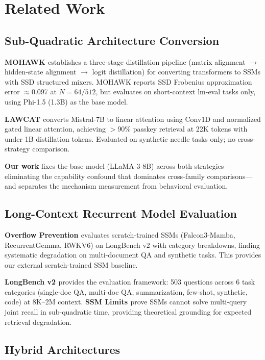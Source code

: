\section{Related Work}

\subsection{Sub-Quadratic Architecture Conversion}

\textbf{MOHAWK \citep{Bick2024MOHAWK}} establishes a three-stage distillation pipeline
(matrix alignment $\to$ hidden-state alignment $\to$ logit distillation) for converting
transformers to SSMs with SSD structured mixers. MOHAWK reports SSD Frobenius approximation
error $\approx$0.097 at $N=64/512$, but evaluates on short-context lm-eval tasks only, using
Phi-1.5 (1.3B) as the base model.

\textbf{LAWCAT \citep{Liu2025LAWCAT}} converts Mistral-7B to linear attention using Conv1D and
normalized gated linear attention, achieving $>$90\% passkey retrieval at 22K tokens with under
1B distillation tokens. Evaluated on synthetic needle tasks only; no cross-strategy comparison.

\textbf{Our work} fixes the base model (LLaMA-3-8B) across both strategies---eliminating the
capability confound that dominates cross-family comparisons---and separates the mechanism
measurement from behavioral evaluation.

\subsection{Long-Context Recurrent Model Evaluation}

\textbf{Overflow Prevention \citep{BenKish2025OverflowPrevention}} evaluates scratch-trained
SSMs (Falcon3-Mamba, RecurrentGemma, RWKV6) on LongBench v2 with category breakdowns, finding
systematic degradation on multi-document QA and synthetic tasks. This provides our external
scratch-trained SSM baseline.

\textbf{LongBench v2 \citep{Bai2024LongBenchV2}} provides the evaluation framework: 503
questions across 6 task categories (single-doc QA, multi-doc QA, summarization, few-shot,
synthetic, code) at 8K--2M context. \textbf{SSM Limits \citep{Zhan2025OvercomingSSM}} prove
SSMs cannot solve multi-query joint recall in sub-quadratic time, providing theoretical grounding
for expected retrieval degradation.

\subsection{Hybrid Architectures}

